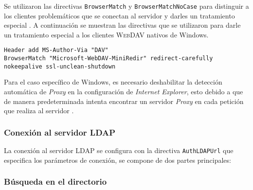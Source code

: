 Se utilizaron las directivas \texttt{BrowserMatch} y \texttt{BrowserMatchNoCase} para distinguir a los clientes problem\'{a}ticos que se conectan al servidor y darles un tratamiento especial \cite{_webdav_????} \cite{_fixing_????}. A continuaci\'{o}n se muestran las directivas que se utilizaron para darle un tratamiento especial a los clientes \textsc{\gls{WebDAV}} nativos de Windows.

{
\scriptsize
\linespread{1}
\begin{verbatim}
Header add MS-Author-Via "DAV" 
BrowserMatch "Microsoft-WebDAV-MiniRedir" redirect-carefully nokeepalive ssl-unclean-shutdown 
\end{verbatim}
}

Para el caso espec\'{i}fico de Windows, es necesario deshabilitar la detecci\'{o}n autom\'{a}tica de \emph{\gls{Proxy}} en la configuraci\'{o}n de \emph{Internet Explorer}, esto debido a que de manera predeterminada intenta encontrar un servidor \emph{\gls{Proxy}} en cada petici\'{o}n que realiza al servidor \cite{oddball_fix_????} \cite{_slow_????} \cite{_using_????}.

        \subsubsection {Conexi\'{o}n al servidor \textsc{LDAP}}

La conexi\'{o}n al servidor \textsc{\gls{LDAP}} se configura con la directiva \texttt{AuthLDAPUrl} que especifica los par\'{a}metros de conexi\'{o}n, se compone de dos partes principales:

{
 \begin{table}[H]
 \caption{Par\'{a}metros de conexi\'{o}n \texttt{LDAP}}{}
 \label{tab:ldap-parameters}
 \noindent{} %
 \end{table}
}

        \subsubsection {B\'{u}squeda en el directorio}

